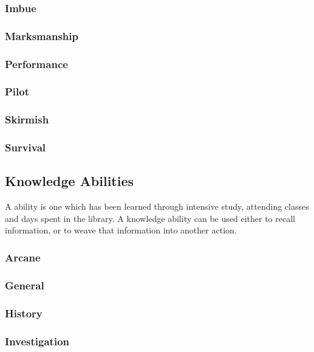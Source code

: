 \subsubsection{Imbue}

\subsubsection{Marksmanship}

\subsubsection{Performance}

\subsubsection{Pilot}

\subsubsection{Skirmish}

\subsubsection{Survival}

\subsection{Knowledge Abilities}


A  ability is one which has been learned through intensive study, attending classes and days spent in the library. A knowledge ability can be used either to recall information, or to weave that information into another action. 
	

\subsubsection{Arcane}

\subsubsection{General}

\subsubsection{History}

\subsubsection{Investigation}

